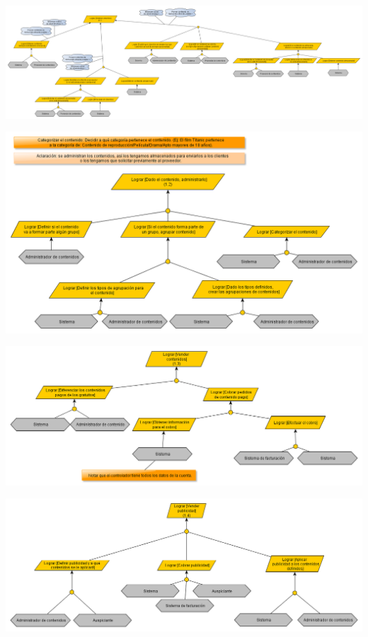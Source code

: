 \documentclass[11pt, a4paper, spanish]{article}
\begin{document}
\newpage
	\begin{center}
		\includegraphics[scale=0.30, angle=90]{Diagramas/1-1ModelodeObjetivosObtenercontenido.png}
	\end{center}
\newpage
	\begin{center}
		\includegraphics[scale=0.65, angle=90]{Diagramas/1-2ModelodeObjetivosAdministrarcontenido.png}
	\end{center}
\newpage
	\begin{center}
		\includegraphics[scale=0.65, angle=90]{Diagramas/1-3ModelodeObjetivosVendercontenido.png}
	\end{center}
\newpage
	\begin{center}
		\includegraphics[scale=0.65, angle=90]{Diagramas/1-4ModelodeObjetivosVenderpublicidad.png}
	\end{center}
\end{document}
